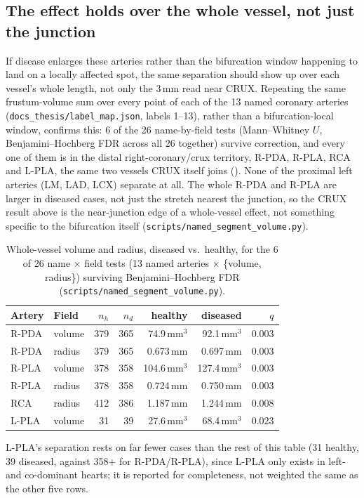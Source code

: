 \subsection*{The effect holds over the whole vessel, not just the junction}

If disease enlarges these arteries rather than the bifurcation window happening to land on a
locally affected spot, the same separation should show up over each vessel's whole length, not
only the 3\,mm read near CRUX. Repeating the same frustum-volume sum over every point of each of
the 13 named coronary arteries (\texttt{docs\_thesis/label\_map.json}, labels 1--13), rather than
a bifurcation-local window, confirms this: 6 of the 26 name-by-field tests (Mann--Whitney $U$,
Benjamini--Hochberg FDR across all 26 together) survive correction, and every one of them is in
the distal right-coronary/crux territory, R-PDA, R-PLA, RCA and L-PLA, the same two vessels CRUX
itself joins (). None of the proximal left arteries (LM, LAD, LCX)
separate at all. The whole R-PDA and R-PLA are larger in diseased cases, not just the stretch
nearest the junction, so the CRUX result above is the near-junction edge of a whole-vessel effect,
not something specific to the bifurcation itself (\texttt{scripts/named\_segment\_volume.py}).

\begin{table}[h]
  \centering
  \caption{Whole-vessel volume and radius, diseased vs.\ healthy, for the 6 of 26 name
    $\times$ field tests (13 named arteries $\times$ \{volume, radius\}) surviving
    Benjamini--Hochberg FDR (\texttt{scripts/named\_segment\_volume.py}).}
  \label{tab:week3-vessel-volume}
  \begin{tabular}{llrrrrr}
    \hline
    Artery & Field & $n_h$ & $n_d$ & healthy & diseased & $q$ \\
    \hline
    R-PDA & volume & 379 & 365 & 74.9\,mm$^3$  & 92.1\,mm$^3$  & 0.003 \\
    R-PDA & radius & 379 & 365 & 0.673\,mm     & 0.697\,mm     & 0.003 \\
    R-PLA & volume & 378 & 358 & 104.6\,mm$^3$ & 127.4\,mm$^3$ & 0.003 \\
    R-PLA & radius & 378 & 358 & 0.724\,mm     & 0.750\,mm     & 0.003 \\
    RCA   & radius & 412 & 386 & 1.187\,mm     & 1.244\,mm     & 0.008 \\
    L-PLA & volume & 31  & 39  & 27.6\,mm$^3$  & 68.4\,mm$^3$  & 0.023 \\
    \hline
  \end{tabular}
\end{table}

L-PLA's separation rests on far fewer cases than the rest of this table (31 healthy, 39 diseased,
against 358+ for R-PDA/R-PLA), since L-PLA only exists in left- and co-dominant hearts; it is
reported for completeness, not weighted the same as the other five rows.

